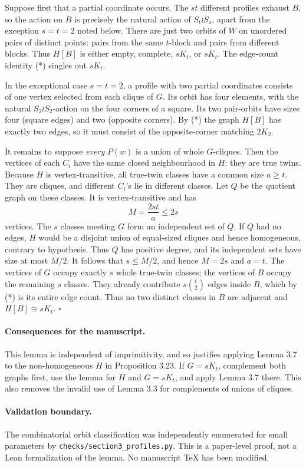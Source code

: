 \documentclass[11pt,a4paper]{article}
\begin{document}
Suppose first that a partial coordinate occurs.
The \(st\) different profiles exhaust \(B\),
so the action on \(B\) is precisely the natural
action of \(S_t\wr S_s\), apart from the
exception \(s=t=2\) noted below.
There are just two orbits of \(W\) on unordered
pairs of distinct points: pairs from the same
\(t\)-block and pairs from different blocks.
Thus \(H[B]\) is either empty, complete,
\(sK_t\), or \(\overline{sK_t}\).
The edge-count identity (*) singles out \(sK_t\).

In the exceptional case \(s=t=2\), a profile
with two partial coordinates consists of
one vertex selected from each clique of \(G\).
Its orbit has four elements, with the natural
\(S_2\wr S_2\)-action on the four corners of
a square. Its two pair-orbits have sizes
four (square edges) and two (opposite corners).
By (*) the graph \(H[B]\) has exactly two edges,
so it must consist of the opposite-corner
matching \(2K_2\).

It remains to suppose \emph{every} \(P(w)\) is a
union of whole \(G\)-cliques. Then the vertices
of each \(C_i\) have the same closed neighbourhood
in \(H\): they are true twins. Because \(H\)
is vertex-transitive, all true-twin classes
have a common size \(a\ge t\).
They are cliques, and different \(C_i\)'s
lie in different classes.
Let \(Q\) be the quotient graph on these classes.
It is vertex-transitive and has
\[
                      M=\frac{2st}{a}\le2s
\]
vertices. The \(s\) classes meeting \(G\)
form an independent set of \(Q\).
If \(Q\) had no edges, \(H\) would be a
disjoint union of equal-sized cliques and
hence homogeneous, contrary to hypothesis.
Thus \(Q\) has positive degree, and its
independent sets have size at most \(M/2\).
It follows that \(s\le M/2\), and hence
\(M=2s\) and \(a=t\).
The vertices of \(G\) occupy exactly \(s\)
whole true-twin classes; the vertices of \(B\)
occupy the remaining \(s\) classes.
They already contribute \(s\binom t2\) edges
inside \(B\), which by (*) is its entire
edge count. Thus no two distinct classes
in \(B\) are adjacent and \(H[B]\cong sK_t\).
\(\square\)

\paragraph{Consequences for the manuscript.}
This lemma is independent of imprimitivity,
and so justifies applying Lemma 3.7 to
the non-homogeneous \(H\) in Proposition 3.23.
If \(G=\overline{sK_t}\), complement
both graphs first, use the lemma for
\(\overline H\) and \(\overline G=sK_t\),
and apply Lemma 3.7 there.
This also removes the invalid use of Lemma 3.3
for complements of unions of cliques.

\paragraph{Validation boundary.}
The combinatorial orbit classification was
independently enumerated for small parameters
by \texttt{checks/section3\_profiles.py}.
This is a paper-level proof, not a Lean
formalization of the lemma. No manuscript
TeX has been modified.
\end{document}

